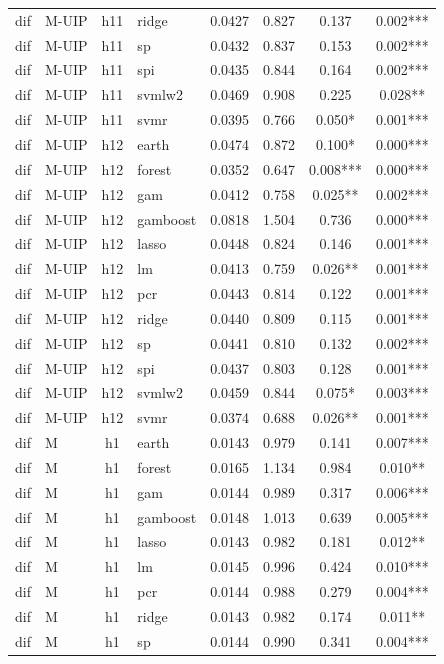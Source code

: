 \begin{ThreePartTable}
\begin{longtable}[t]{llclcccc}
dif & M-UIP & h11 & ridge & 0.0427 & 0.827 & 0.137 & 0.002***\\
dif & M-UIP & h11 & sp & 0.0432 & 0.837 & 0.153 & 0.002***\\
dif & M-UIP & h11 & spi & 0.0435 & 0.844 & 0.164 & 0.002***\\
dif & M-UIP & h11 & svmlw2 & 0.0469 & 0.908 & 0.225 & 0.028**\\
dif & M-UIP & h11 & svmr & 0.0395 & 0.766 & 0.050* & 0.001***\\
\addlinespace
dif & M-UIP & h12 & earth & 0.0474 & 0.872 & 0.100* & 0.000***\\
dif & M-UIP & h12 & forest & 0.0352 & 0.647 & 0.008*** & 0.000***\\
dif & M-UIP & h12 & gam & 0.0412 & 0.758 & 0.025** & 0.002***\\
dif & M-UIP & h12 & gamboost & 0.0818 & 1.504 & 0.736 & 0.000***\\
dif & M-UIP & h12 & lasso & 0.0448 & 0.824 & 0.146 & 0.001***\\
dif & M-UIP & h12 & lm & 0.0413 & 0.759 & 0.026** & 0.001***\\
dif & M-UIP & h12 & pcr & 0.0443 & 0.814 & 0.122 & 0.001***\\
dif & M-UIP & h12 & ridge & 0.0440 & 0.809 & 0.115 & 0.001***\\
dif & M-UIP & h12 & sp & 0.0441 & 0.810 & 0.132 & 0.002***\\
dif & M-UIP & h12 & spi & 0.0437 & 0.803 & 0.128 & 0.001***\\
dif & M-UIP & h12 & svmlw2 & 0.0459 & 0.844 & 0.075* & 0.003***\\
dif & M-UIP & h12 & svmr & 0.0374 & 0.688 & 0.026** & 0.001***\\
\addlinespace
dif & M & h1 & earth & 0.0143 & 0.979 & 0.141 & 0.007***\\
dif & M & h1 & forest & 0.0165 & 1.134 & 0.984 & 0.010**\\
dif & M & h1 & gam & 0.0144 & 0.989 & 0.317 & 0.006***\\
dif & M & h1 & gamboost & 0.0148 & 1.013 & 0.639 & 0.005***\\
dif & M & h1 & lasso & 0.0143 & 0.982 & 0.181 & 0.012**\\
dif & M & h1 & lm & 0.0145 & 0.996 & 0.424 & 0.010***\\
dif & M & h1 & pcr & 0.0144 & 0.988 & 0.279 & 0.004***\\
dif & M & h1 & ridge & 0.0143 & 0.982 & 0.174 & 0.011**\\
dif & M & h1 & sp & 0.0144 & 0.990 & 0.341 & 0.004***\\

\end{longtable}
\end{ThreePartTable}
